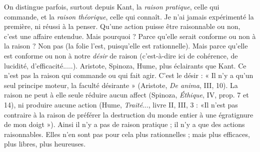 On distingue parfois, surtout depuis Kant, la {\it raison pratique}, celle qui commande,
et la {\it raison théorique}, celle qui connaît. Je n’ai jamais expérimenté la
première, ni réussi à la penser. Qu’une action puisse être raisonnable ou non,
c’est une affaire entendue. Mais pourquoi ? Parce qu’elle serait conforme ou
non à la raison ? Non pas (la folie l’est, puisqu’elle est rationnelle). Mais parce
qu’elle est conforme ou non à notre {\it désir} de raison (c’est-à-dire ici de cohérence,
de lucidité, d’efficacité.....). Aristote, Spinoza, Hume, plus éclairants que
Kant. Ce n’est pas la raison qui commande ou qui fait agir. C’est le désir : « Il
n’y a qu’un seul principe moteur, la faculté désirante » (Aristote, {\it De anima}, III,
10). La raison ne peut à elle seule réduire aucun affect (Spinoza, {\it Éthique}, IV,
prop. 7 et 14), ni produire aucune action (Hume, {\it Traité}..., livre II, III, 3 : «Il
n’est pas contraire à la raison de préférer la destruction du monde entier à une
égratignure de mon doigt »). Ainsi il n’y a pas de raison pratique ; il n’y a que
des actions raisonnables. Elles n’en sont pas pour cela plus rationnelles ; mais
plus efficaces, plus libres, plus heureuses.


